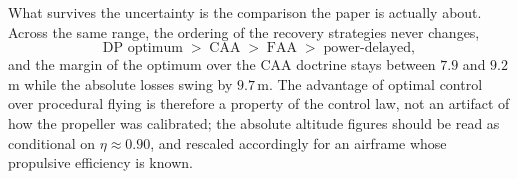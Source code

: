 What survives the uncertainty is the comparison the paper is actually
about. Across the same range, the ordering of the recovery strategies
never changes,
\begin{equation*}
    \text{DP optimum} \;>\; \text{CAA} \;>\; \text{FAA}
    \;>\; \text{power-delayed},
\end{equation*}
and the margin of the optimum over the CAA doctrine stays between
$7.9$ and $9.2$\,m while the absolute losses swing by $9.7$\,m. The
advantage of optimal control over procedural flying is therefore a
property of the control law, not an artifact of how the propeller was
calibrated; the absolute altitude figures should be read as conditional
on $\eta \approx 0.90$, and rescaled accordingly for an airframe whose
propulsive efficiency is known.


